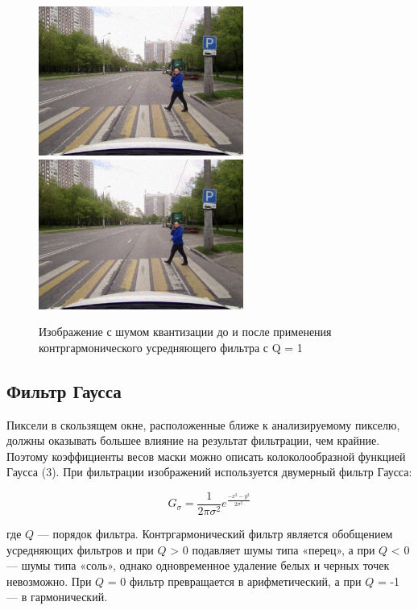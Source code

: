 \begin{figure}[ht]
    \centering
    \includegraphics[width=0.6\textwidth]{../outputs/image_quant_noise.png}
    \includegraphics[width=0.6\textwidth]{../addition/image_quant_countergarmonic_filter_Q1.png}
    \caption{Изображение с шумом квантизации до и после применения контргармонического усредняющего фильтра с Q = 1}
    \label{fig:stich_images}
\end{figure}


\pagebreak



\subsection{Фильтр Гаусса}

Пиксели в скользящем окне, расположенные ближе к анализируемому пикселю, должны оказывать большее влияние на результат 
фильтрации, чем крайние. Поэтому коэффициенты весов маски можно описать колоколообразной функцией Гаусса (3). При
фильтрации изображений используется двумерный фильтр Гаусса:



\begin{equation}
    G_\sigma = \frac{1}{2\pi\sigma^2} e ^{\frac{-x^2-y^2}{2\sigma^2}}
\label{eq:complex_func}
\end{equation}

где $Q$ — порядок фильтра. Контргармонический фильтр является
обобщением усредняющих фильтров и при $Q$ > 0 подавляет шумы
типа «перец», а при $Q$ < 0 — шумы типа «соль», однако одновременное удаление 
белых и черных точек невозможно. При $Q$ = 0 фильтр превращается в арифметический, 
а при $Q$ = -1 — в гармонический.

